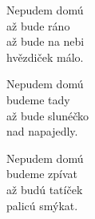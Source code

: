 
\ve{}
Nepudem domú\\
až bude ráno\\
až bude na nebi\\
hvězdiček málo.

\ve{}
Nepudem domú\\
budeme tady\\
až bude slunéčko\\
nad napajedly.

\ve{}
Nepudem domú\\
budeme zpívat\\
až budú tatíček\\
palicú smýkat. 

\esong{}